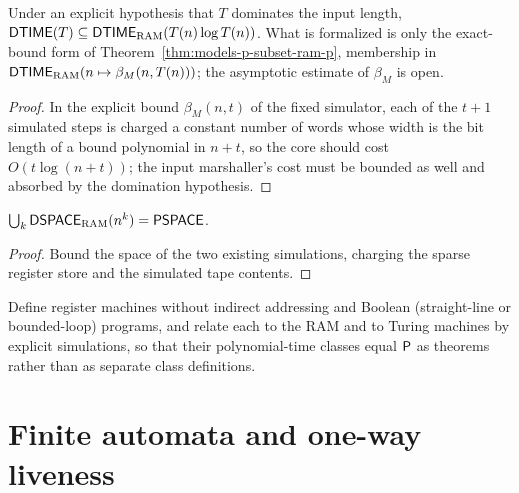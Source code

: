 \begin{theorem}
  \label{thm:models-dtime-subset-ram-dtime}
  Under an explicit hypothesis that $T$ dominates the input length,
  $\mathsf{DTIME}(T) \subseteq \mathsf{DTIME}_{\mathrm{RAM}}(T(n) \log T(n))$.
  What is formalized is only the exact-bound form of
  Theorem~\ref{thm:models-p-subset-ram-p}, membership in
  $\mathsf{DTIME}_{\mathrm{RAM}}(n \mapsto \beta_M(n, T(n)))$; the asymptotic
  estimate of $\beta_M$ is open.
\end{theorem}
\begin{proof}
  In the explicit bound $\beta_M(n, t)$ of the fixed simulator, each of the
  $t + 1$ simulated steps is charged a constant number of words whose width is
  the bit length of a bound polynomial in $n + t$, so the core should cost
  $O(t \log(n + t))$; the input marshaller's cost must be bounded as well and
  absorbed by the domination hypothesis.
\end{proof}

\begin{theorem}
  \label{thm:models-ram-pspace}
  $\bigcup_k \mathsf{DSPACE}_{\mathrm{RAM}}(n^k) = \mathsf{PSPACE}$.
\end{theorem}
\begin{proof}
  Bound the space of the two existing simulations, charging the sparse
  register store and the simulated tape contents.
\end{proof}

\begin{theorem}
  \label{thm:models-ram-variants}
  \notready
  Define register machines without indirect addressing and Boolean
  (straight-line or bounded-loop) programs, and relate each to the RAM and to
  Turing machines by explicit simulations, so that their polynomial-time
  classes equal $\mathsf{P}$ as theorems rather than as separate class
  definitions.
\end{theorem}

\section{Finite automata and one-way liveness}
\label{sec:models-finite-automata}

